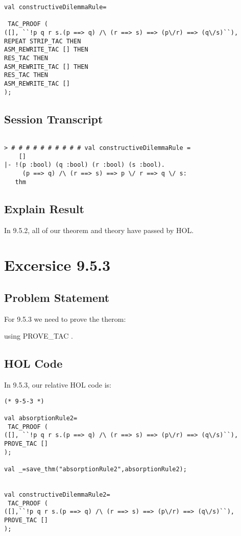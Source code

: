 \documentclass{report}
\begin{document}
\begin{lstlisting}[frame=trBL]
val constructiveDilemmaRule=

 TAC_PROOF (
([], ``!p q r s.(p ==> q) /\ (r ==> s) ==> (p\/r) ==> (q\/s)``),
REPEAT STRIP_TAC THEN
ASM_REWRITE_TAC [] THEN
RES_TAC THEN
ASM_REWRITE_TAC [] THEN
RES_TAC THEN
ASM_REWRITE_TAC []
);

\end{lstlisting}

\section{Session Transcript}
\label{Session Trans 952}
\setcounter{sessioncount}{0}
\begin{session}
  \begin{scriptsize}
\begin{verbatim}

> # # # # # # # # # # val constructiveDilemmaRule =
    []
|- !(p :bool) (q :bool) (r :bool) (s :bool).
     (p ==> q) /\ (r ==> s) ==> p \/ r ==> q \/ s:
   thm

\end{verbatim}
  \end{scriptsize}
\end{session}
\section{Explain Result}
\label{explain result 952}
In 9.5.2, all of our theorem and theory have passed by HOL.


\chapter{Excersice 9.5.3}
\label{Ex 953}
\section{Problem Statement}
\label{Problem State 953}
For 9.5.3 we need to prove the therom:
\HOLexerciseNineTheoremsabsorptionRule
\HOLexerciseNineTheoremsconstructiveDilemmaRule

using PROVE_TAC .

\section{HOL Code}
\label{HOl Code 953}
In 9.5.3, our relative HOL code is:
\begin{lstlisting}[frame=trBL]
(* 9-5-3 *)

val absorptionRule2=
 TAC_PROOF (
([], ``!p q r s.(p ==> q) /\ (r ==> s) ==> (p\/r) ==> (q\/s)``),
PROVE_TAC []
);

val _=save_thm("absorptionRule2",absorptionRule2);


val constructiveDilemmaRule2=
 TAC_PROOF (
([],``!p q r s.(p ==> q) /\ (r ==> s) ==> (p\/r) ==> (q\/s)``),
PROVE_TAC []
);
\end{lstlisting}
\end{document}
